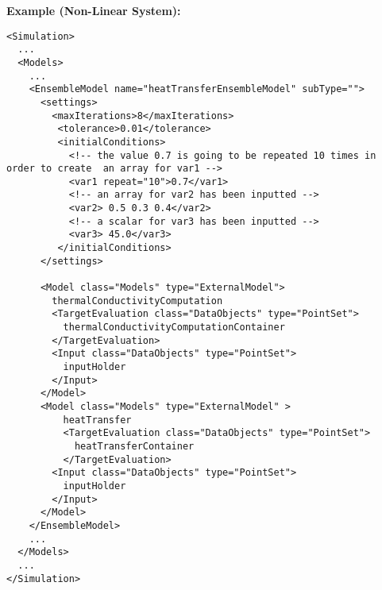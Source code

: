 \textbf{Example (Non-Linear System):}
\begin{lstlisting}[style=XML,morekeywords={subType,debug,repeat,name,class,type}]
<Simulation>
  ...
  <Models>
    ...
    <EnsembleModel name="heatTransferEnsembleModel" subType="">
      <settings>
        <maxIterations>8</maxIterations>
         <tolerance>0.01</tolerance>
         <initialConditions>
           <!-- the value 0.7 is going to be repeated 10 times in order to create  an array for var1 -->
           <var1 repeat="10">0.7</var1>
           <!-- an array for var2 has been inputted -->
           <var2> 0.5 0.3 0.4</var2>
           <!-- a scalar for var3 has been inputted -->
           <var3> 45.0</var3>
         </initialConditions>
      </settings>

      <Model class="Models" type="ExternalModel">
        thermalConductivityComputation
        <TargetEvaluation class="DataObjects" type="PointSet">
          thermalConductivityComputationContainer
        </TargetEvaluation>
        <Input class="DataObjects" type="PointSet">
          inputHolder
        </Input>
      </Model>
      <Model class="Models" type="ExternalModel" >
          heatTransfer
          <TargetEvaluation class="DataObjects" type="PointSet">
            heatTransferContainer
          </TargetEvaluation>
        <Input class="DataObjects" type="PointSet">
          inputHolder
        </Input>
      </Model>
    </EnsembleModel>
    ...
  </Models>
  ...
</Simulation>
\end{lstlisting}
